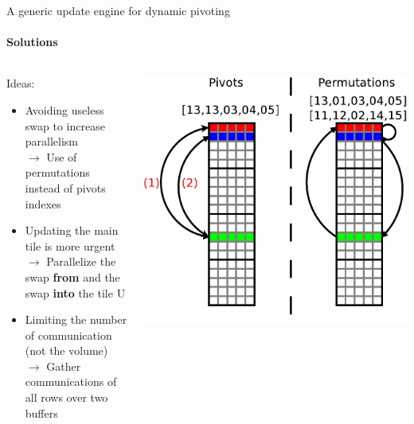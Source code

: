 \begin{frame}{A generic update engine for dynamic pivoting}
\framesubtitle{Solutions}
\begin{columns}
\begin{column}{.60\textwidth}
Ideas:
\begin{itemize}
\item Avoiding useless swap to increase parallelism\\
$\rightarrow$ Use of permutations instead of pivots indexes
\item Updating the main tile is more urgent\\
$\rightarrow$ Parallelize the swap \textbf{from} and the swap \textbf{into} the tile U
\item Limiting the number of communication (not the volume)\\
$\rightarrow$ Gather communications of all rows over two buffers
\end{itemize}
\end{column}
\begin{column}{.40\textwidth}
\begin{center}
\includegraphics[scale=0.3]{pivots.pdf}
\end{center}
\end{column}
\end{columns}
\end{frame}

